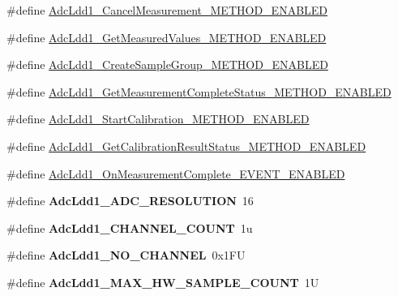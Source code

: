 \begin{DoxyCompactItemize}
\item 
\#define \hyperlink{group___adc_ldd1__module_gac8248dbbc82166f5d84209b42574e893}{Adc\+Ldd1\+\_\+\+Cancel\+Measurement\+\_\+\+M\+E\+T\+H\+O\+D\+\_\+\+E\+N\+A\+B\+L\+ED}
\item 
\#define \hyperlink{group___adc_ldd1__module_ga4336debe2c49b40ec5cf443ebdc14fd4}{Adc\+Ldd1\+\_\+\+Get\+Measured\+Values\+\_\+\+M\+E\+T\+H\+O\+D\+\_\+\+E\+N\+A\+B\+L\+ED}
\item 
\#define \hyperlink{group___adc_ldd1__module_ga3bb31af9978aad248d5f22efeffdc062}{Adc\+Ldd1\+\_\+\+Create\+Sample\+Group\+\_\+\+M\+E\+T\+H\+O\+D\+\_\+\+E\+N\+A\+B\+L\+ED}
\item 
\#define \hyperlink{group___adc_ldd1__module_gaa5b50f914a3fc9d61298427cfc2e2eba}{Adc\+Ldd1\+\_\+\+Get\+Measurement\+Complete\+Status\+\_\+\+M\+E\+T\+H\+O\+D\+\_\+\+E\+N\+A\+B\+L\+ED}
\item 
\#define \hyperlink{group___adc_ldd1__module_gac899fcf8121917ba023d530d404521fe}{Adc\+Ldd1\+\_\+\+Start\+Calibration\+\_\+\+M\+E\+T\+H\+O\+D\+\_\+\+E\+N\+A\+B\+L\+ED}
\item 
\#define \hyperlink{group___adc_ldd1__module_ga3434a6cf32cd48ee67a1a47fb5f91547}{Adc\+Ldd1\+\_\+\+Get\+Calibration\+Result\+Status\+\_\+\+M\+E\+T\+H\+O\+D\+\_\+\+E\+N\+A\+B\+L\+ED}
\item 
\#define \hyperlink{group___adc_ldd1__module_ga5c863eb6c996c95ecf9e799fd5819e89}{Adc\+Ldd1\+\_\+\+On\+Measurement\+Complete\+\_\+\+E\+V\+E\+N\+T\+\_\+\+E\+N\+A\+B\+L\+ED}
\item 
\mbox{\label{group___adc_ldd1__module_gaa8922b556b79ff448ddd20979eda016d}} 
\#define {\bfseries Adc\+Ldd1\+\_\+\+A\+D\+C\+\_\+\+R\+E\+S\+O\+L\+U\+T\+I\+ON}~16
\item 
\mbox{\label{group___adc_ldd1__module_ga1fd3f1eef1222a8b6fd2b9f83736a49a}} 
\#define {\bfseries Adc\+Ldd1\+\_\+\+C\+H\+A\+N\+N\+E\+L\+\_\+\+C\+O\+U\+NT}~1u
\item 
\mbox{\label{group___adc_ldd1__module_ga7d870f5e63fbe60a4c8ed64bb54faebc}} 
\#define {\bfseries Adc\+Ldd1\+\_\+\+N\+O\+\_\+\+C\+H\+A\+N\+N\+EL}~0x1\+FU
\item 
\mbox{\label{group___adc_ldd1__module_ga0b2218fd28c1cf32594ae2bac6a091cb}} 
\#define {\bfseries Adc\+Ldd1\+\_\+\+M\+A\+X\+\_\+\+H\+W\+\_\+\+S\+A\+M\+P\+L\+E\+\_\+\+C\+O\+U\+NT}~1U

\end{DoxyCompactItemize}
